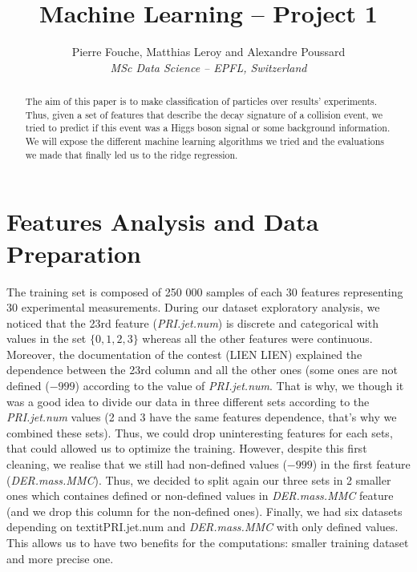 \documentclass[10pt,conference,compsocconf]{IEEEtran}
\begin{document}
\title{Machine Learning -- Project 1}

\author{
  Pierre Fouche, Matthias Leroy and Alexandre Poussard\\
  \textit{MSc Data Science -- EPFL, Switzerland}
}

\maketitle

\begin{abstract}
  The aim of this paper is to make classification of particles over results' experiments. Thus, given a set of features that describe the decay signature of a collision event, we tried to predict if this event was a Higgs boson signal or some background information. We will expose the different machine learning algorithms we tried and the evaluations we made that finally led us to the ridge regression.
\end{abstract}

\section{Features Analysis and Data Preparation}

The training set is composed of 250 000 samples of each 30 features representing 30 experimental measurements. During our dataset exploratory analysis, we noticed that the 23rd feature (\textit{PRI.jet.num}) is discrete and categorical with values in the set $\{0,1,2,3\}$ whereas all the other features were continuous. Moreover, the documentation of the contest (LIEN LIEN) explained the dependence between the 23rd column and all the other ones (some ones are not defined ($-999$) according to the value of \textit{PRI.jet.num}. That is why, we though it was a good idea to divide our data in three different sets according to the \textit{PRI.jet.num} values (2 and 3 have the same features dependence, that's why we combined these sets). Thus, we could drop uninteresting features for each sets, that could allowed us to optimize the training. However, despite this first cleaning, we realise that we still had non-defined values ($-999$) in the first feature (\textit{DER.mass.MMC}). Thus, we decided to split again our three sets in 2 smaller ones which containes defined or non-defined values in \textit{DER.mass.MMC} feature (and we drop this column for the non-defined ones).
Finally, we had six datasets depending on textit{PRI.jet.num} and \textit{DER.mass.MMC} with only defined values. This allows us to have two benefits for the computations: smaller training dataset and more precise one.
\end{document}
